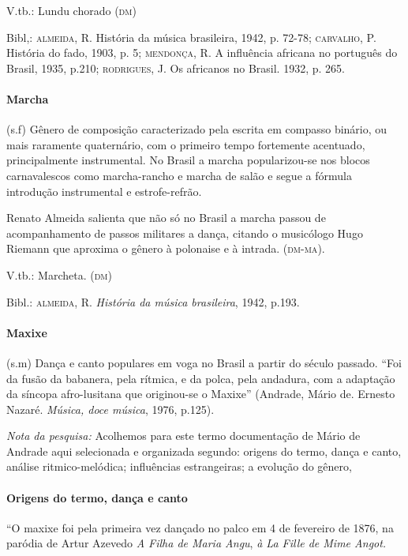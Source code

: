 V.tb.: Lundu chorado (\textsc{dm})

Bibl,: \textsc{almeida}, R. História da música brasileira, 1942, p. 72-78;
\textsc{carvalho}, P. História do fado, 1903, p. 5; \textsc{mendonça}, R. A influência
africana no português do Brasil, 1935, p.210; \textsc{rodrigues}, J. Os africanos
no Brasil. 1932, p. 265.

\paragraph{Marcha} (s.f) Gênero de composição caracterizado pela escrita
em compasso binário, ou mais raramente quaternário, com o primeiro tempo
fortemente acentuado, principalmente instrumental. No Brasil a marcha
popularizou-se nos blocos carnavalescos como marcha-rancho e marcha de
salão e segue a fórmula introdução instrumental e estrofe-refrão.

Renato Almeida salienta que não só no Brasil a marcha passou de
acompanhamento de passos militares a dança, citando o musicólogo Hugo
Riemann que aproxima o gênero à polonaise e à intrada. (\textsc{dm-ma}).

V.tb.: Marcheta. (\textsc{dm})

Bibl.: \textsc{almeida}, R. \emph{História da música brasileira}, 1942, p.193.

\paragraph{Maxixe} (s.m) Dança e canto populares em voga no Brasil a
partir do século passado. ``Foi da fusão da babanera, pela rítmica, e da
polca, pela andadura, com a adaptação da síncopa afro-lusitana que
originou-se o Maxixe'' (Andrade, Mário de. Ernesto Nazaré. \emph{Música,
doce música}, 1976, p.125).

\emph{Nota da pesquisa:} Acolhemos para este termo documentação de Mário
de Andrade aqui selecionada e organizada segundo: origens do termo,
dança e canto, análise ritmico-melódica; influências estrangeiras; a
evolução do gênero,

\paragraph{Origens do termo, dança e canto}

``O maxixe foi pela primeira vez dançado no palco em 4 de fevereiro de
1876, na paródia de Artur Azevedo \emph{A Filha de Maria Angu}, \emph{à
La Fille de Mime Angot.}


